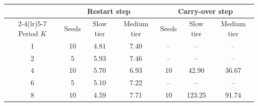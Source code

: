 \begin{tabular}{@{}ccccccc@{}}
\toprule
 & \multicolumn{3}{c}{Restart step} & \multicolumn{3}{c}{Carry-over step}\\
\cmidrule(lr){2-4}\cmidrule(lr){5-7}
Period $K$ & Seeds & Slow tier & Medium tier & Seeds & Slow tier & Medium tier\\
\midrule
1 & 10 & 4.81 & 7.40 & -- & -- & --\\
2 & 5 & 5.93 & 7.46 & -- & -- & --\\
4 & 10 & 5.70 & 6.93 & 10 & 42.90 & 36.67\\
6 & 5 & 5.10 & 7.22 & -- & -- & --\\
8 & 10 & 4.59 & 7.71 & 10 & 123.25 & 91.74\\
\bottomrule
\end{tabular}
